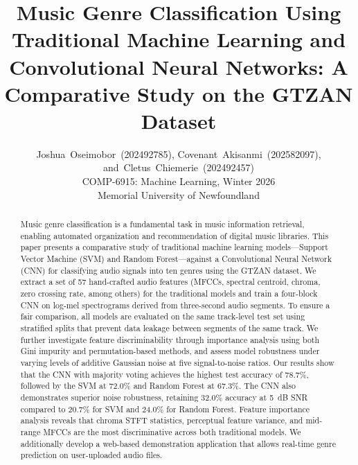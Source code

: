 \documentclass[10pt,journal]{IEEEtran}
\begin{document}
\title{Music Genre Classification Using Traditional Machine Learning and Convolutional Neural Networks: A Comparative Study on the GTZAN Dataset}

\author{Joshua~Oseimobor~(202492785),
        Covenant~Akisanmi~(202582097),
        and~Cletus~Chiemerie~(202492457)\\
        COMP-6915: Machine Learning, Winter 2026\\
        Memorial University of Newfoundland}

\maketitle

\begin{abstract}
Music genre classification is a fundamental task in music information retrieval, enabling automated organization and recommendation of digital music libraries.
This paper presents a comparative study of traditional machine learning models---Support Vector Machine (SVM) and Random Forest---against a Convolutional Neural Network (CNN) for classifying audio signals into ten genres using the GTZAN dataset.
We extract a set of 57 hand-crafted audio features (MFCCs, spectral centroid, chroma, zero crossing rate, among others) for the traditional models and train a four-block CNN on log-mel spectrograms derived from three-second audio segments.
To ensure a fair comparison, all models are evaluated on the same track-level test set using stratified splits that prevent data leakage between segments of the same track.
We further investigate feature discriminability through importance analysis using both Gini impurity and permutation-based methods, and assess model robustness under varying levels of additive Gaussian noise at five signal-to-noise ratios.
Our results show that the CNN with majority voting achieves the highest test accuracy of 78.7\%, followed by the SVM at 72.0\% and Random Forest at 67.3\%. The CNN also demonstrates superior noise robustness, retaining 32.0\% accuracy at 5~dB SNR compared to 20.7\% for SVM and 24.0\% for Random Forest.
Feature importance analysis reveals that chroma STFT statistics, perceptual feature variance, and mid-range MFCCs are the most discriminative across both traditional models.
We additionally develop a web-based demonstration application that allows real-time genre prediction on user-uploaded audio files.
\end{abstract}
\end{document}
